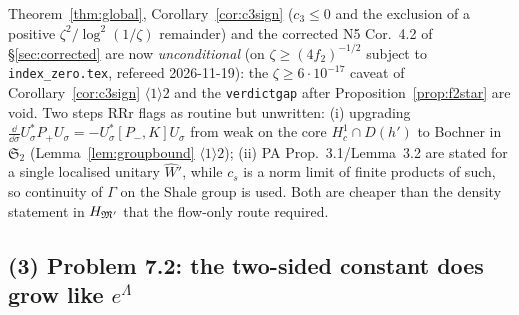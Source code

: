 \documentclass[11pt]{article}
\newcommand{\Stwo}{\mathfrak S_2}
\newcommand{\Pp}{P_+}\newcommand{\Pm}{P_-}
\begin{document}
\begin{verdictok}
Theorem~\ref{thm:global}, Corollary~\ref{cor:c3sign} ($c_3\le0$ and the exclusion of a positive
$\zeta^2/\log^2(1/\zeta)$ remainder) and the corrected N5 Cor.~4.2 of \S\ref{sec:corrected} are now
\emph{unconditional} (on $\zeta\ge(4f_2)^{-1/2}$ subject to \texttt{index\_zero.tex}, refereed 2026-11-19): the $\zeta\ge6\cdot10^{-17}$ caveat of Corollary~\ref{cor:c3sign}
$\langle1\rangle2$ and the \texttt{verdictgap} after Proposition~\ref{prop:f2star} are void.  Two
steps RRr flags as routine but unwritten: (i) upgrading
$\frac{\dd}{\dd\sigma}U_\sigma^*\Pp U_\sigma=-U_\sigma^*[\Pm,K]U_\sigma$ from weak on the core
$H^1_c\cap D(h')$ to Bochner in $\Stwo$ (Lemma~\ref{lem:groupbound} $\langle1\rangle2$); (ii) PA
Prop.~3.1/Lemma~3.2 are stated for a single localised unitary $\widehat W'$, while $c_s$ is a norm
limit of finite products of such, so continuity of $\Gamma$ on the Shale group is used.  Both are
cheaper than the density statement in $H_{\mathfrak M'}$ that the flow-only route required.
\end{verdictok}

\subsection{(3) Problem 7.2: the two-sided constant does grow like $e^\Lambda$}\label{sec:rrr-72}
\end{document}
